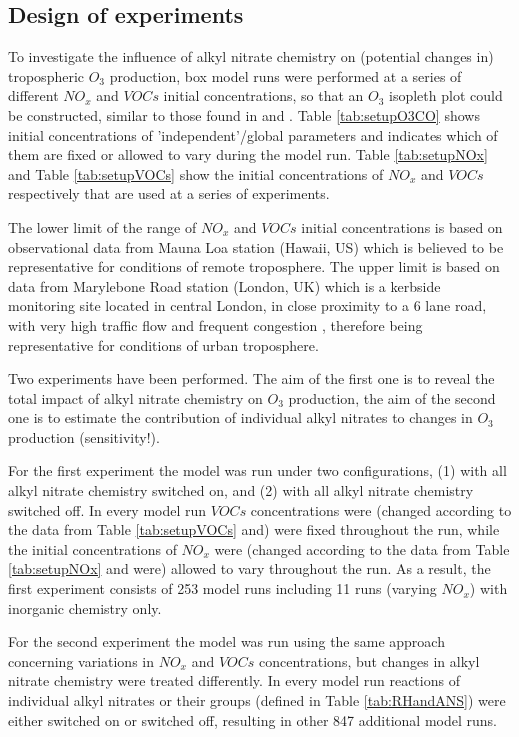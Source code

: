 \documentclass[11pt,a4paper]{article}
\begin{document}
\subsection{Design of experiments}\label{sec:method_expdesign}
To investigate the influence of alkyl nitrate chemistry on (potential changes in) tropospheric $O_3$ production, box model runs were performed at a series of different $NO_x$ and $VOCs$ initial concentrations, so that an $O_3$ isopleth plot could be constructed, similar to those found in \citep{Dodge1977} and \citep{Sillman1999}.   Table \ref{tab:setupO3CO} shows initial concentrations of 'independent'/global parameters and indicates which of them are fixed or allowed to vary during the model run. Table \ref{tab:setupNOx} and Table \ref{tab:setupVOCs} show the initial concentrations of $NO_x$ and $VOCs$ respectively that are used at a series of experiments.

The lower limit of the range of $NO_x$ and $VOCs$ initial concentrations is based on observational data from Mauna Loa station (Hawaii, US) which is believed to be representative for conditions of remote troposphere. The upper limit is based on data from 
Marylebone Road station (London, UK) which is a kerbside monitoring site located in central London, in close proximity to a 6 lane road, with very high traffic flow and frequent congestion \citep{VonSchneidemesser2010}, therefore being representative for conditions of urban troposphere.

Two experiments have been performed. The aim of the first one is to reveal the total impact of alkyl nitrate chemistry on $O_3$ production, the aim of the second one is to estimate the contribution of individual alkyl nitrates to changes in $O_3$ production (sensitivity!).

For the first experiment the model was run under two configurations, (1) with all alkyl nitrate chemistry switched on, and (2) with all alkyl nitrate chemistry switched off. In every model run $VOCs$ concentrations were (changed according to the data from Table \ref{tab:setupVOCs} and) were fixed throughout the run, while the initial concentrations of $NO_x$ were (changed according to the data from Table \ref{tab:setupNOx} and were) allowed to vary throughout the run. As a result, the first experiment consists of 253 model runs including 11 runs (varying $NO_x$) with inorganic chemistry only.

For the second experiment the model was run using the same approach concerning variations in $NO_x$ and $VOCs$ concentrations, but changes in alkyl nitrate chemistry were treated differently. In every model run reactions of individual alkyl nitrates or their groups (defined in Table \ref{tab:RHandANS}) were either switched on or switched off, resulting in other 847 additional model runs.
\end{document}
